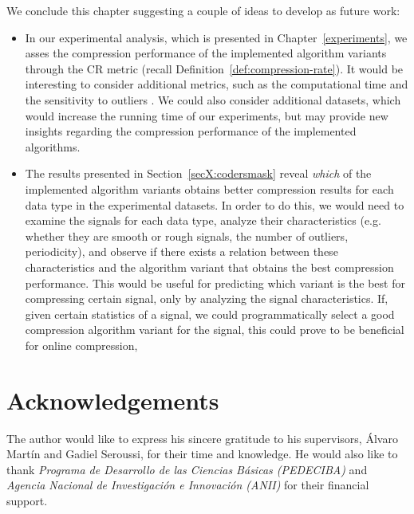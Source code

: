 

We conclude this chapter suggesting a couple of ideas to develop as future work:

\vspace{-5pt}

\begin{itemize} 

\item In our experimental analysis, which is presented in Chapter~\ref{experiments}, we asses the compression performance of the implemented algorithm variants through the CR metric (recall Definition~\ref{def:compression-rate}). It would be interesting to consider additional metrics, such as the computational time and the sensitivity to outliers \cite{AnEva2013}. We could also consider additional datasets, which would increase the running time of our experiments, but may provide new insights regarding the compression performance of the implemented algorithms.

\item The results presented in Section~\ref{secX:codersmask} reveal \textit{which} of the implemented algorithm variants obtains better compression results for each data type in the experimental datasets.  In order to do this, we would need to examine the signals for each data type, analyze their characteristics (e.g. whether they are smooth or rough signals, the number of outliers, periodicity), and observe if there exists a relation between these characteristics and the algorithm variant that obtains the best compression performance. This would be useful for predicting which variant is the best for compressing certain signal, only by analyzing the signal characteristics. If, given certain statistics of a signal, we could programmatically select a good compression algorithm variant for the signal, this could prove to be beneficial for online compression, 
\end{itemize}


\clearpage


\chapter*{Acknowledgements}

The author would like to express his sincere gratitude to his supervisors, Álvaro Martín and Gadiel Seroussi, for their time and knowledge. He would also like to thank \textit{Programa de Desarrollo de las Ciencias Básicas (PEDECIBA)} and \textit{Agencia Nacional de Investigación e Innovación (ANII)} for their financial support.

\clearpage